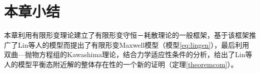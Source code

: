 

\section{本章小结}
本章利用有限形变理论建立了有限形变守恒－耗散理论的一般框架，基于该框架推广了Lin等人的模型而提出了有限形变Maxwell模型（模型\eqref{eq:lingen}），最后利用双曲—抛物方程组的Kawashima理论，结合力学适应性条件的分析，给出了Lin等人的模型平衡态附近解的整体存在性的一个新的证明（定理\ref{theoremcom}）。


% 
% 
% 